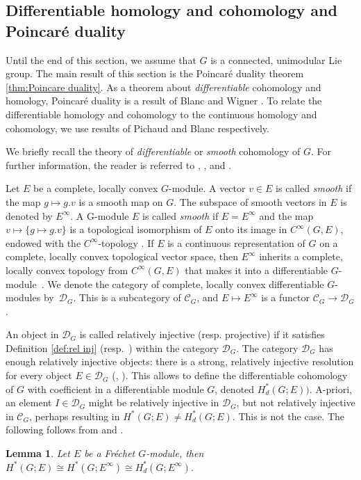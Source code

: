 \documentclass[12pt,reqno]{amsart}
\newtheorem{lemma}[theorem]{Lemma}
\theoremstyle{definition}
\begin{document}
\subsection{Differentiable homology and cohomology and Poincar\'e duality}\label{subsec:4.3}

Until the end of this section, we assume that $G$ is a connected, unimodular Lie group.
The main result of this section is the Poincar\'e duality theorem \ref{thm:Poincare duality}.
As a theorem about \emph{differentiable} cohomology and homology, Poincar\'e duality is a result of Blanc and Wigner \cite{BlancWigner}. To relate the differentiable homology and cohomology to the continuous homology and cohomology, we use results of Pichaud \cite{PichaudRegularization} and Blanc \cite{Blanc} respectively. 

 We briefly recall the theory of \emph{differentiable} or \emph{smooth} cohomology of $G$. For further information, the reader is referred to \cite{HochschildMostow}, \cite[Parties I,VI]{PichaudRegularization}, and \cite{BlancWigner}. 

Let $E$ be a complete, locally convex $G$-module. A vector $v \in E$ is called \emph{smooth} if the map $g \mapsto g.v$ is a smooth map on $G$. The subspace of smooth vectors in $E$ is denoted by $E^\infty$. A  G-module $E$ is called \emph{smooth} if $E=E^\infty$ and the map $v \mapsto \{g \mapsto g.v\}$ is a topological isomorphism of $E$ onto its image in $C^\infty(G,E)$, endowed with the $C^\infty$-topology \cite[Subsection~0.2.3]{BorelWallach}. If $E$ is a continuous representation of $G$ on a complete, locally convex topological vector space, then $E^\infty$ inherits a complete, locally convex topology from $C^\infty(G,E)$ that makes it into a differentiable $G$-module~\cite[Proposition~4.6]{Neeb}. We denote the category of complete, locally convex differentiable $G$-modules by~$\mathcal{D}_G$. This is a subcategory of $\mathcal{C}_G$, and $E \mapsto E^\infty$ is a functor $\mathcal{C}_G \to \mathcal{D}_G$.

An object in $\mathcal{D}_G$ is called relatively injective (resp. projective) if it satisfies Definition \ref{def:rel inj} (resp.~\cite[Definition~C.18]{Petersen}) within the category $\mathcal{D}_G$. The category $\mathcal{D}_G$ has enough relatively injective objects: there is a strong, relatively injective resolution for every object $E \in \mathcal{D}_G$ (\cite[Section 5]{Blanc}, \cite[Chapter~XI.5]{BorelWallach}). This allows to define the differentiable cohomology of $G$ with coefficient in a differentiable module $G$, denoted $H^*_d(G;E))$. A-priori, an element $I \in \mathcal{D}_G$ might be relatively injective in $\mathcal{D}_G$, but not relatively injective in $\mathcal{C}_G$, perhaps resulting in $H^*(G;E) \ne H_d^*(G;E)$. This is not the case. The following follows from \cite[Theorem~5.2]{Blanc} and \cite[Lemma IX.5.2]{BorelWallach}.
\begin{lemma}\label{lem:smooth and cont cohom}
    Let $E$ be a Fr\'echet $G$-module, then $H^*(G;E)\cong H^*(G;E^\infty) \cong H^*_d(G;E^\infty)$.
\end{lemma}
\end{document}
